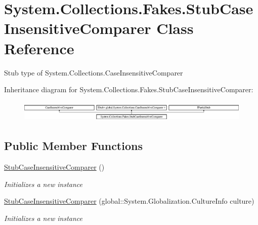 \hypertarget{class_system_1_1_collections_1_1_fakes_1_1_stub_case_insensitive_comparer}{\section{System.\-Collections.\-Fakes.\-Stub\-Case\-Insensitive\-Comparer Class Reference}
\label{class_system_1_1_collections_1_1_fakes_1_1_stub_case_insensitive_comparer}
}


Stub type of System.\-Collections.\-Case\-Insensitive\-Comparer 


Inheritance diagram for System.\-Collections.\-Fakes.\-Stub\-Case\-Insensitive\-Comparer\-:\begin{figure}[H]
\begin{center}
\leavevmode
\includegraphics[height=1.025641cm]{class_system_1_1_collections_1_1_fakes_1_1_stub_case_insensitive_comparer}
\end{center}
\end{figure}
\subsection*{Public Member Functions}
\begin{DoxyCompactItemize}
\item 
\hyperlink{class_system_1_1_collections_1_1_fakes_1_1_stub_case_insensitive_comparer_a25a480442fa19b9ee11b109ce6cb7261}{Stub\-Case\-Insensitive\-Comparer} ()
\begin{DoxyCompactList}\small\item\em Initializes a new instance\end{DoxyCompactList}\item 
\hyperlink{class_system_1_1_collections_1_1_fakes_1_1_stub_case_insensitive_comparer_ac0fc5109496cd20f4e34979106302b5f}{Stub\-Case\-Insensitive\-Comparer} (global\-::\-System.\-Globalization.\-Culture\-Info culture)
\begin{DoxyCompactList}\small\item\em Initializes a new instance\end{DoxyCompactList}\end{DoxyCompactItemize}
